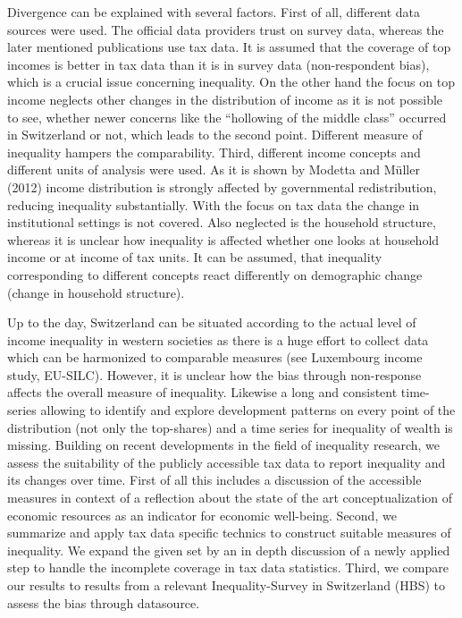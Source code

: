 \documentclass[twoside]{article}\usepackage[]{graphicx}\usepackage[]{color}
\begin{document}
\begin{multicols}{2}
Divergence can be explained with several factors. First of all, different data sources were used. The official data providers trust on survey data, whereas the later mentioned publications use tax data. It is assumed that the coverage of top incomes is better in tax data than it is in survey data (non-respondent bias), which is a crucial issue concerning inequality. On the other hand the focus on top income neglects other changes in the distribution of income as it is not possible to see, whether newer concerns like the ``hollowing of the middle class'' occurred in Switzerland or not, which leads to the second point. Different measure of inequality hampers the comparability. Third, different income concepts and different units of analysis were used. As it is shown by Modetta and Müller (2012) income distribution is strongly affected by governmental redistribution, reducing inequality substantially. With the focus on tax data the change in institutional settings is not covered. Also neglected is the household structure, whereas it is unclear how inequality is affected whether one looks at household income or at income of tax units. It can be assumed, that inequality corresponding to different concepts react differently on demographic change (change in household structure). 







Up to the day, Switzerland can be situated according to the actual level of income inequality in western societies as there is a huge effort to collect data which can be harmonized to comparable measures (see Luxembourg income study, EU-SILC). However, it is unclear how the bias through non-response affects the overall measure of inequality. Likewise a long and consistent time-series allowing to identify and explore development patterns on every point of the distribution (not only the top-shares) and a time series for inequality of wealth is missing. Building on recent developments in the field of inequality research, we assess the suitability of the publicly accessible tax data to report inequality and its changes over time. First of all this includes a discussion of the accessible measures in context of a reflection about the state of the art conceptualization of economic resources as an indicator for economic well-being. Second, we summarize and apply tax data specific technics to construct suitable measures of inequality. We expand the given set by an in depth discussion of a newly applied step to handle the incomplete coverage in tax data statistics. Third, we compare our results to results from a relevant Inequality-Survey in Switzerland (HBS) to assess the bias through datasource.


\end{multicols}
\end{document}
